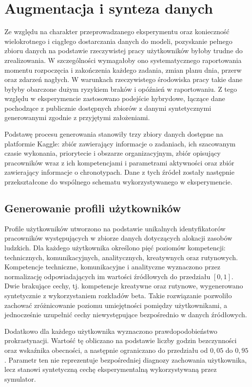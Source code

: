 \section{Augmentacja i synteza danych}
\label{sec:augmentacja_synteza}

Ze względu na charakter przeprowadzanego eksperymentu oraz konieczność wielokrotnego i ciągłego dostarczania danych do modeli, pozyskanie pełnego zbioru danych na podstawie rzeczywistej pracy użytkowników byłoby trudne do zrealizowania. W szczególności wymagałoby ono systematycznego raportowania momentu rozpoczęcia i zakończenia każdego zadania, zmian planu dnia, przerw oraz zdarzeń nagłych. W warunkach rzeczywistego środowiska pracy takie dane byłyby obarczone dużym ryzykiem braków i opóźnień w raportowaniu. Z tego względu w eksperymencie zastosowano podejście hybrydowe, łączące dane pochodzące z publicznie dostępnych zbiorów z danymi syntetycznymi generowanymi zgodnie z przyjętymi założeniami.

Podstawę procesu generowania stanowiły trzy zbiory danych dostępne na platformie Kaggle: zbiór zawierający informacje o zadaniach, ich szacowanym czasie wykonania, priorytecie i obszarze organizacyjnym, zbiór opisujący pracowników wraz z ich kompetencjami i parametrami aktywności oraz zbiór zawierający informacje o chronotypach. Dane z tych źródeł zostały następnie przekształcone do wspólnego schematu wykorzystywanego w eksperymencie.

\subsection{Generowanie profili użytkowników}

Profile użytkowników utworzono na podstawie unikalnych identyfikatorów pracowników występujących w zbiorze danych dotyczących alokacji zasobów ludzkich. Dla każdego użytkownika określono pięć poziomów kompetencji: technicznych, komunikacyjnych, analitycznych, kreatywnych oraz rutynowych. Kompetencje techniczne, komunikacyjne i analityczne wyznaczono przez normalizację odpowiadających im wartości źródłowych do przedziału $[0,1]$. Dwie brakujące cechy, tj. kompetencje kreatywne oraz rutynowe, wygenerowano syntetycznie z wykorzystaniem rozkładów beta. Takie rozwiązanie pozwoliło zachować zróżnicowanie poziomu umiejętności pomiędzy użytkownikami, a jednocześnie uzupełnić cechy niewystępujące bezpośrednio w danych źródłowych.

Dodatkowo dla każdego użytkownika wyznaczono prawdopodobieństwo prokrastynacji. Wartość tę obliczano na podstawie liczby godzin bezczynności oraz wskaźnika obecności, a następnie ograniczano do przedziału od $0{,}05$ do $0{,}95$. Parametr ten nie reprezentuje bezpośredniej diagnozy zachowania użytkownika, lecz stanowi syntetyczną cechę eksperymentalną wykorzystywaną przez symulator.

